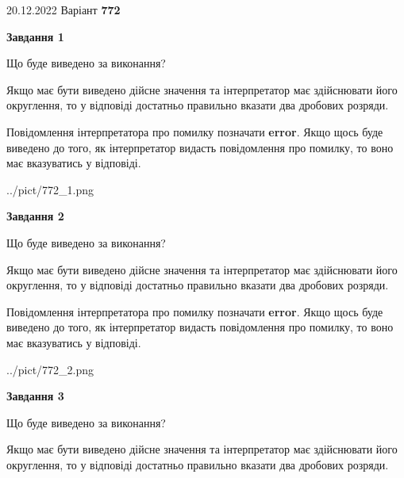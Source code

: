 \documentclass[12pt, ukrainian]{article}
\begin{document}
{20.12.2022 Варіант \No \textbf { 772 }\par}
{
\begin {Large}

{\begin {center}\textbf{Завдання 1}\end {center}}\par
Що буде виведено за виконання? \par

Якщо має бути виведено дійсне значення та інтерпретатор має здійснювати його округлення, 
то у відповіді достатньо правильно вказати два дробових розряди.

Повідомлення інтерпретатора про помилку позначати \textbf{error}.
Якщо щось буде виведено до того, як інтерпретатор видасть повідомлення про помилку, 
то воно має вказуватись у відповіді. \par

\begin{center}
	{../pict/772_1.png}
\end{center}
\newpage

{\begin {center}\textbf{Завдання 2}\end {center}}\par
Що буде виведено за виконання? \par

Якщо має бути виведено дійсне значення та інтерпретатор має здійснювати його округлення, 
то у відповіді достатньо правильно вказати два дробових розряди.

Повідомлення інтерпретатора про помилку позначати \textbf{error}.
Якщо щось буде виведено до того, як інтерпретатор видасть повідомлення про помилку, 
то воно має вказуватись у відповіді. \par

\begin{center}
	{../pict/772_2.png}
\end{center}
\newpage

{\begin {center}\textbf{Завдання 3}\end {center}}\par
Що буде виведено за виконання? \par

Якщо має бути виведено дійсне значення та інтерпретатор має здійснювати його округлення, 
то у відповіді достатньо правильно вказати два дробових розряди.


\end{Large}}
\end{document}
